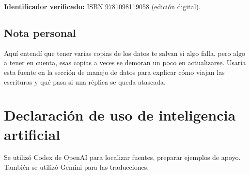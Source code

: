 \documentclass[12pt,a4paper]{article}
\begin{document}
\textbf{Identificador verificado:} ISBN \href{https://www.oreilly.com/library/view/designing-data-intensive/9781098119058/}{9781098119058} (edición digital).

\subsection*{Nota personal}

Aquí entendí que tener varias copias de los datos te salvan si algo falla, pero algo a tener en cuenta, esas copias a veces se demoran un poco en actualizarse. Usaría esta fuente en la sección de manejo de datos para explicar cómo viajan las escrituras y qué pasa si una réplica se queda atascada.

\section*{Declaración de uso de inteligencia artificial}

Se utilizó Codex de OpenAI para localizar fuentes, preparar ejemplos de apoyo. También se utilizó Gemini para las traducciones.

\printbibliography[title={Referencias bibliográficas}]
\end{document}
